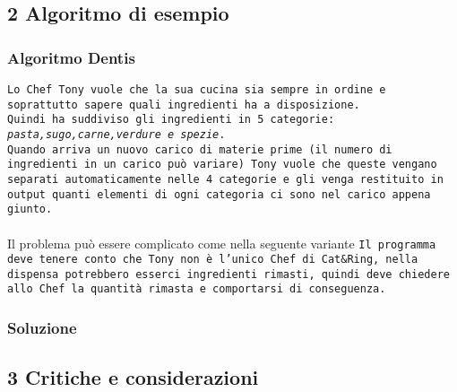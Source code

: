 \documentclass[a4paper]{article}
\begin{document}
\subsection{2 Algoritmo di esempio}
\subsubsection{Algoritmo Dentis}
\texttt{Lo Chef Tony vuole che la sua cucina sia sempre in ordine e soprattutto sapere quali ingredienti ha a disposizione.\\Quindi ha suddiviso gli ingredienti in 5 categorie: \textit{pasta,sugo,carne,verdure e spezie}.\\Quando arriva un nuovo carico di materie prime (il numero di ingredienti in un carico può variare) Tony vuole che queste vengano separati automaticamente nelle 4 categorie e gli venga restituito in output quanti elementi di ogni categoria ci sono nel carico appena giunto.}\\\\
Il problema può essere complicato come nella seguente variante \texttt{Il programma deve tenere conto che Tony non è l'unico Chef di Cat\&Ring, nella dispensa potrebbero esserci ingredienti rimasti, quindi deve chiedere allo Chef la quantità rimasta e comportarsi di conseguenza.}
\subsubsection{Soluzione}
\subsection{3 Critiche e considerazioni}
\printbibliography
\end{document}
